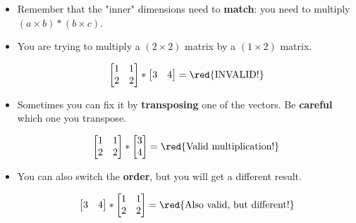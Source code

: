         \begin{itemize}
            \item Remember that the "inner" dimensions need to \textbf{match}: you need to multiply $(a \times b) * (b \times c)$.
            \item \miniex You are trying to multiply a $(2 \times 2)$ matrix by a $(1 \times 2)$ matrix. 
            
            \begin{equation*}
                \begin{bmatrix}
                  1&1\\2&2
                \end{bmatrix}
                *
                \begin{bmatrix}
                  3&4
                \end{bmatrix}
                =
                \text{\red{INVALID!}}
            \end{equation*}
            
            \item Sometimes you can fix it by \textbf{transposing} one of the vectors. Be \textbf{careful} which one you transpose.
            
            \begin{equation*}
                \begin{bmatrix}
                  1&1\\2&2
                \end{bmatrix}
                *
                \begin{bmatrix}
                  3\\4
                \end{bmatrix}
                =
                \text{\red{Valid multiplication!}}
            \end{equation*}
            
            \item You can also switch the \textbf{order}, but you will get a different result.
            
            \begin{equation*}
                \begin{bmatrix}
                  3&4
                \end{bmatrix}
                *
                \begin{bmatrix}
                  1&1\\2&2
                \end{bmatrix}
                =
                \text{\red{Also valid, but different!}}
            \end{equation*}
            
        \end{itemize}
        
